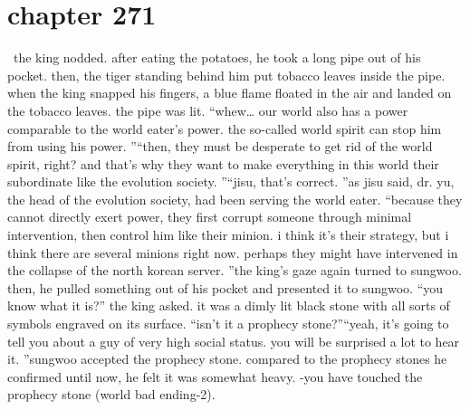 \section{chapter 271}






 the king nodded.
 after eating the potatoes, he took a long pipe out of his pocket.
then, the tiger standing behind him put tobacco leaves inside the pipe.
when the king snapped his fingers, a blue flame floated in the air and landed on the tobacco leaves.
 the pipe was lit.
“whew… our world also has a power comparable to the world eater’s power.
 the so-called world spirit can stop him from using his power.
”“then, they must be desperate to get rid of the world spirit, right? and that’s why they want to make everything in this world their subordinate like the evolution society.
”“jisu, that’s correct.
”as jisu said, dr.
 yu, the head of the evolution society, had been serving the world eater.
“because they cannot directly exert power, they first corrupt someone through minimal intervention, then control him like their minion.
 i think it’s their strategy, but i think there are several minions right now.
 perhaps they might have intervened in the collapse of the north korean server.
”the king’s gaze again turned to sungwoo.
 then, he pulled something out of his pocket and presented it to sungwoo.
“you know what it is?” the king asked.
it was a dimly lit black stone with all sorts of symbols engraved on its surface.
“isn’t it a prophecy stone?”“yeah, it’s going to tell you about a guy of very high social status.
 you will be surprised a lot to hear it.
”sungwoo accepted the prophecy stone.
 compared to the prophecy stones he confirmed until now, he felt it was somewhat heavy.
-you have touched the prophecy stone (world bad ending-2).

